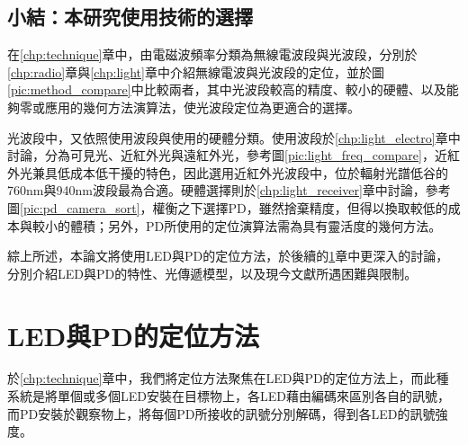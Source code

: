                 


        
                

        \subsection{小結：本研究使用技術的選擇}
        

        在\ref{chp:technique}章中，由電磁波頻率分類為無線電波段與光波段，分別於\ref{chp:radio}章與\ref{chp:light}章中介紹無線電波與光波段的定位，並於圖\ref{pic:method_compare}中比較兩者，其中光波段較高的精度、較小的硬體、以及能夠零或應用的幾何方法演算法，使光波段定位為更適合的選擇。

        光波段中，又依照使用波段與使用的硬體分類。使用波段於\ref{chp:light_electro}章中討論，分為可見光、近紅外光與遠紅外光，參考圖\ref{pic:light_freq_compare}，近紅外光兼具低成本低干擾的特色，因此選用近紅外光波段中，位於輻射光譜低谷的760nm與940nm波段最為合適。硬體選擇則於\ref{chp:light_receiver}章中討論，參考圖\ref{pic:pd_camera_sort}，權衡之下選擇PD，雖然捨棄精度，但得以換取較低的成本與較小的體積；另外，PD所使用的定位演算法需為具有靈活度的幾何方法。
    
        
        綜上所述，本論文將使用LED與PD的定位方法，於後續的\ref{chp:LEDandPD}章中更深入的討論，分別介紹LED與PD的特性、光傳遞模型，以及現今文獻所遇困難與限制。


        

    

        

        

        

        


        

        

            

          

        


\section{LED與PD的定位方法}
\label{chp:LEDandPD}
    


    
    於\ref{chp:technique}章中，我們將定位方法聚焦在LED與PD的定位方法上，而此種系統是將單個或多個LED安裝在目標物上，各LED藉由編碼來區別各自的訊號，而PD安裝於觀察物上，將每個PD所接收的訊號分別解碼，得到各LED的訊號強度。

